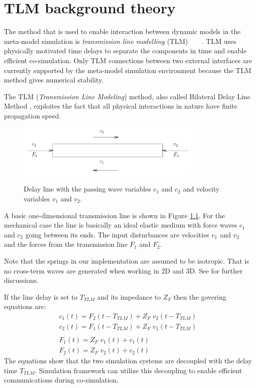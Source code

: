 \chapter{TLM background theory}
\label{secTLMtheory}
The method that is used to enable interaction between dynamic models in
the meta-model simulation is
\emph{transmission line modelling} (TLM)~\cite{Johns-80}~\cite{KrusModMech-99}~\cite{KrusDistrSim}~\cite{Cogan-06}.
TLM uses physically motivated time delays to separate the components
in time and enable efficient co-simulation. Only TLM connections
between two external interfaces are currently supported by the
meta-model simulation environment because the TLM method gives
numerical stability.


The TLM (\emph{Transmission Line Modeling}) method, also called Bilateral Delay Line Method \cite{Johns-80},
exploites the fact that all physical interactions
in nature have finite propagation speed.
\begin{figure}
\begin{center}
   {\includegraphics[width=9cm]{figs/TLMline.png}}
\caption{Delay line with the passing wave variables $c_1$ and $c_2$
and velocity variables $v_1$ and $v_2$.}
\end{center}
\label{figTLMline}
\end{figure}

A basic one-dimensional transmission line is shown in Figure \ref{figTLMline}.
For the mechanical case the line is basically an ideal elastic medium
 with force waves $c_1$ and $c_2$ going between its ends. 
The input disturbances are velocities $v_1$ and $v_2$ and the
forces from the transmission line $F_1$ and $F_2$.

Note that the springs in our implementation are assumed to be isotropic.
That is no cross-term waves are generated when working in 2D and 3D. 
See \cite{KrusModMech-99} for further discussions.

If the line delay is set to $T_{TLM}$ and its impedance to $Z_F$ then
the govering equations are:
\begin{equation}
\begin{array}{l}
c_1(t) = F_2(t-T_{TLM})+ Z_F \; v_2(t-T_{TLM})\\
c_2(t) = F_1(t-T_{TLM})+ Z_F \; v_1(t-T_{TLM})\\
\\
F_1(t) = Z_F \; v_1(t) + c_1(t) \\
F_2(t) = Z_F \; v_2(t) + c_2(t)
\end{array}
\label{eqTLM}
\end{equation}
The equations show that the two simulation systems are decoupled with
the delay time $T_{TLM}$. Simulation framework can utilize this decoupling
to enable efficient communications during co-simulation. 

